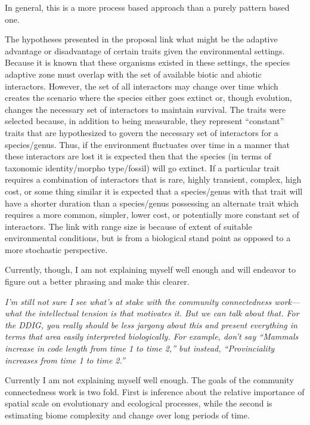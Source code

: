 \documentclass{article}
\begin{document}
In general, this is a more process based approach than a purely pattern based one.

The hypotheses presented in the proposal link what might be the adaptive advantage or disadvantage of certain traits given the environmental settings. Because it is known that these organisms existed in these settings, the species adaptive zone must overlap with the set of available biotic and abiotic interactors. However, the set of all interactors may change over time which creates the scenario where the species either goes extinct or, though evolution, changes the necessary set of interactors to maintain survival. The traits were selected because, in addition to being measurable, they represent ``constant'' traits that are hypothesized to govern the necessary set of interactors for a species/genus. Thus, if the environment fluctuates over time in a manner that these interactors are lost it is expected then that the species (in terms of taxonomic identity/morpho type/fossil) will go extinct. If a particular trait requires a combination of interactors that is rare, highly transient, complex, high cost, or some thing similar it is expected that a species/genus with that trait will have a shorter duration than a species/genus possessing an alternate trait which requires a more common, simpler, lower cost, or potentially more constant set of interactors. The link with range size is because of extent of suitable environmental conditions, but is from a biological stand point as opposed to a more stochastic perspective. 

Currently, though, I am not explaining myself well enough and will endeavor to figure out a better phrasing and make this clearer.


\textit{I'm still not sure I see what's at stake with the community connectedness work---what the intellectual tension is that motivates it.  But we can talk about that.  For the DDIG, you really should be less jargony about this and present everything in terms that area easily interpreted biologically.   For example, don't say ``Mammals increase in code length from time 1 to time 2,'' but instead, ``Provinciality increases from time 1 to time 2.''}

Currently I am not explaining myself well enough. The goals of the community connectedness work is two fold. First is inference about the relative importance of spatial scale on evolutionary and ecological processes, while the second is estimating biome complexity and change over long periods of time. 
\end{document}
